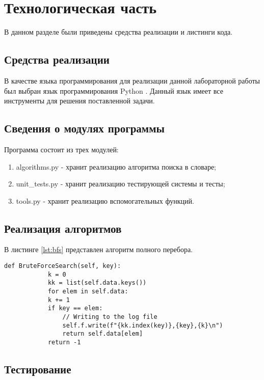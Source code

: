 \chapter{Технологическая часть}

В данном разделе были приведены средства реализации и листинги кода.

\section{Средства реализации}

В качестве языка программирования для реализации данной лабораторной работы был выбран язык программирования Python \cite{pythonlang}. Данный язык имеет все инструменты для решения поставленной задачи.

\section{Сведения о модулях программы}
Программа состоит из трех модулей:
\begin{enumerate}
	\item algorithms.py - хранит реализацию алгоритма поиска в словаре;
	\item unit\_tests.py - хранит реализацию тестирующей системы и тесты;
	\item tools.py - хранит реализацию вспомогательных функций.
\end{enumerate}


\section{Реализация алгоритмов}

В листинге \ref{lst:bfs} представлен алгоритм полного перебора.
\begin{center}
	\captionsetup{justification=raggedright,singlelinecheck=off}
	
	\begin{lstlisting}[label=lst:bfs,caption=Реализация алгоритма поиска полным перебором]
		def BruteForceSearch(self, key):
			k = 0
			kk = list(self.data.keys())
			for elem in self.data:
			k += 1
			if key == elem:
				// Writing to the log file 
				self.f.write(f"{kk.index(key)},{key},{k}\n") 
				return self.data[elem]
			return -1
	\end{lstlisting}
\end{center}

\section{Тестирование}

